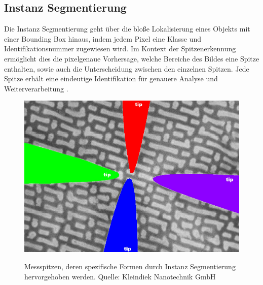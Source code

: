 \subsection{Instanz Segmentierung}
Die Instanz Segmentierung geht über die bloße Lokalisierung eines Objekts mit einer Bounding Box hinaus, indem jedem Pixel eine Klasse und Identifikationsnummer zugewiesen wird. Im Kontext der Spitzenerkennung ermöglicht dies die pixelgenaue Vorhersage, welche Bereiche des Bildes eine Spitze enthalten, sowie auch die Unterscheidung zwischen den einzelnen Spitzen. Jede Spitze erhält eine eindeutige Identifikation für genauere Analyse und Weiterverarbeitung \cite{paperswithcode-compvis}.
\begin{figure}[h]
    \centering
    \includegraphics[width=.6\textwidth, angle=0]{img/22 nm_instancesegmentation_nonum.png}
    \label{fig:inseg}
    \caption{Messspitzen, deren spezifische Formen durch Instanz Segmentierung hervorgehoben werden. Quelle: Kleindiek Nanotechnik GmbH}
\end{figure}
